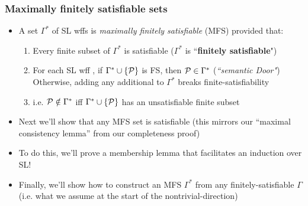 \begin{frame}
\frametitle{Maximally finitely satisfiable sets}

\begin{itemize}[<+->]

\item A set $\Gamma^{\ast}$ of SL wffs is \emph{maximally finitely satisfiable} (MFS) provided that:

\begin{enumerate}[1.)]

\item Every finite subset of $\Gamma^{\ast}$ is satisfiable ($\Gamma^{\ast}$ is ``\textbf{finitely satisfiable}")

\item For each SL wff , if $\Gamma^{\ast} \cup \{\mathcal{P} \}$ is FS, then $\mathcal{P} \in \Gamma^{\ast}$ (\textit{``semantic Door"}) \\ Otherwise, adding any additional  to $\Gamma^{\ast}$ breaks finite-satisfiability

\item[] i.e. $\mathcal{P} \notin \Gamma^{\ast}$ iff $\Gamma^{\ast} \cup \{\mathcal{P} \}$ has an unsatisfiable finite subset 





\end{enumerate} 

\bigskip

\item Next we'll show that any MFS set is satisfiable (this mirrors our ``maximal consistency lemma'' from our completeness proof)

\item To do this, we'll prove a membership lemma that facilitates an induction over SL! 

\item Finally, we'll show how to construct an MFS $\Gamma^{\ast}$ from any finitely-satisfiable $\Gamma$ \\ (i.e. what we assume at the start of the nontrivial-direction)

\end{itemize}
\end{frame}

